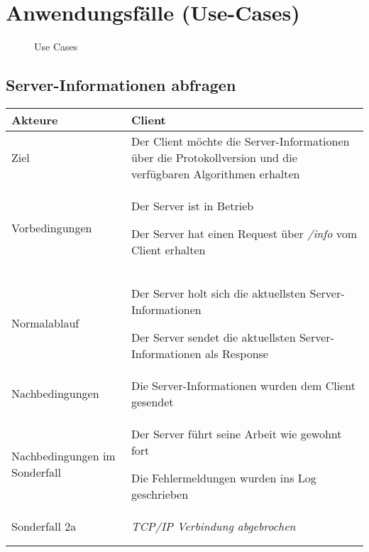 \documentclass[a4paper,10pt,titlepage]{article}
\makeatletter
\newcommand\novspace{\@minipagetrue}
\newenvironment{owncompactitem}{%
\compactitem
}{%
\@finalstrut\@arstrutbox
\@nameuse{endcompactitem}%
\aftergroup\let\aftergroup\@finalstrut\aftergroup\@gobble
}
\newenvironment{owncompactenum}{%
\compactenum
}{%
\@finalstrut\@arstrutbox
\@nameuse{endcompactenum}%
\aftergroup\let\aftergroup\@finalstrut\aftergroup\@gobble
}
\newcommand{\usecase}[7]
{\subsection{#1}
\setlength{\extrarowheight}{2pt}
\begin{tabular}{|p{0.2\textwidth}|p{0.9\textwidth}|}
\hline
  Akteure & #2\\\hline
  Ziel & #3\\\hline
  Vorbedingungen & \novspace
  	\begin{owncompactitem}[-] #4 \end{owncompactitem} \\\hline
  Normalablauf & \vspace{-7pt}
  	\begin{owncompactenum}[1.] #6 \end{owncompactenum} \\\hline
  Nachbedingungen & \novspace
  	\begin{owncompactitem}[-] #5 \end{owncompactitem} \\\hline
  #7
\end{tabular}
}
\newcommand{\sonderfall}[4][\empty]
{
Sonderfall #2 & \vspace{-10pt}
	\textit{#3}
	\begin{owncompactenum}[{#2}.1] {#4} \end{owncompactenum}
  	\ifthenelse{\equal{#1}{\empty}}
    	{\\\hline} %
    	{\ensuremath{\rightarrow} #1 \\ [+1pt] \hline} %

}
\newcommand{\kurzersonderfall}[3][\empty]
{
Sonderfall #2 & \vspace{-10pt}
	\textit{#3}
  	\ifthenelse{\equal{#1}{\empty}}
    	{\\\hline} %
    	{\\&\ensuremath{\rightarrow} #1 \\ [+1pt] \hline} %

}
\newcommand{\sondernachbedingung}[1]
{
Nachbedingungen im Sonderfall& \novspace
	\begin{owncompactitem}[-]
		#1
	\end{owncompactitem} \\\hline
}
\makeatother
\begin{document}
\clearpage
\section{Anwendungsfälle (Use-Cases)}
\begin{figure}[H]
  \centering
  \caption{Use Cases}
\end{figure}




{%
}{%
}{%
}{%
}{%
}

{%
}{%
}

{%
}

\usecase{Server-Informationen abfragen}{Client}%
{%
Der Client möchte die Server-Informationen über die Protokollversion und die verfügbaren Algorithmen erhalten
}{%
\item Der Server ist in Betrieb
\item Der Server hat einen Request über \textit{/info} vom Client erhalten
}{%
\item Die Server-Informationen wurden dem Client gesendet
}{%
\item Der Server holt sich die aktuellsten Server-Informationen
\item Der Server sendet die aktuellsten Server-Informationen als Response
}{%
\sondernachbedingung{
	\item Der Server führt seine Arbeit wie gewohnt fort
	\item Die Fehlermeldungen wurden ins Log geschrieben}

\sonderfall{2a}%
	{%
	TCP/IP Verbindung abgebrochen
	}{%
	\item Fehlermeldung "`TCP/IP Verbindung abgebrochen"' ins Log schreiben}
}
\end{document}
